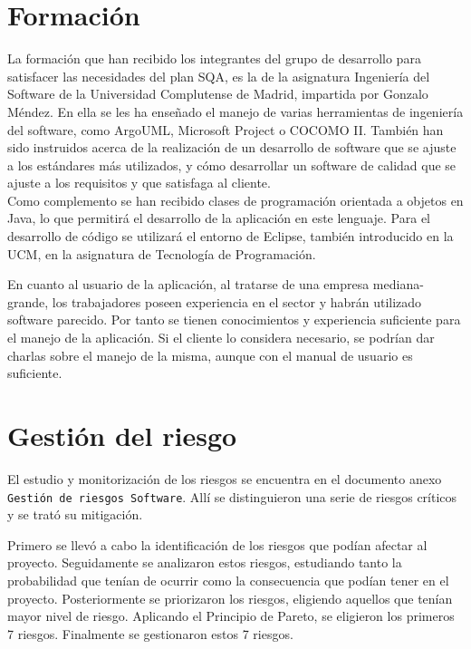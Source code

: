 \documentclass[spanish,a4paper,11pt, twoside]{report}	%
\begin{document}
\chapter{ \hspace{0.25cm}Formación}
	La formación que han recibido los integrantes del grupo de desarrollo para satisfacer las necesidades del plan SQA, es la de la asignatura Ingeniería del Software de la Universidad Complutense de Madrid, impartida por Gonzalo Méndez. En ella se les ha enseñado el manejo
	de varias herramientas de ingeniería del software, como ArgoUML, Microsoft Project o COCOMO II. También han sido instruidos acerca de la realización de un desarrollo de software que se ajuste a los estándares más utilizados, y cómo
	 desarrollar un software de calidad que se ajuste a los requisitos y que satisfaga al cliente.\\
	
	Como complemento se han recibido clases de programación orientada a objetos en Java, lo que permitirá el desarrollo de la aplicación en este lenguaje. Para el desarrollo de código se utilizará el entorno de Eclipse, también introducido en la UCM, en la asignatura de Tecnología de Programación.

	En cuanto al usuario de la aplicación, al tratarse de una empresa mediana- grande, los trabajadores poseen experiencia en el sector y habrán utilizado software parecido. Por tanto se tienen conocimientos y experiencia suficiente para el manejo de la aplicación. Si el cliente lo considera necesario, se podrían dar charlas sobre el manejo de la misma, aunque con el manual de usuario es suficiente.

\newpage
\mbox{}
\thispagestyle{empty}						%
\newpage

\chapter{ \hspace{0.25cm}Gestión del riesgo}
	El estudio y monitorización de los riesgos se encuentra en el documento anexo \texttt{Gestión de riesgos Software}. Allí se distinguieron una serie de riesgos críticos y se trató su mitigación. 

	Primero se llevó a cabo la identificación de los riesgos que podían afectar al proyecto. Seguidamente se analizaron estos riesgos, estudiando tanto la probabilidad que tenían de ocurrir como la consecuencia que podían tener en el proyecto. Posteriormente se priorizaron los riesgos, eligiendo aquellos que tenían mayor nivel de riesgo. Aplicando el Principio de Pareto, se eligieron los primeros 7 riesgos. Finalmente se gestionaron estos 7 riesgos.
\end{document}
